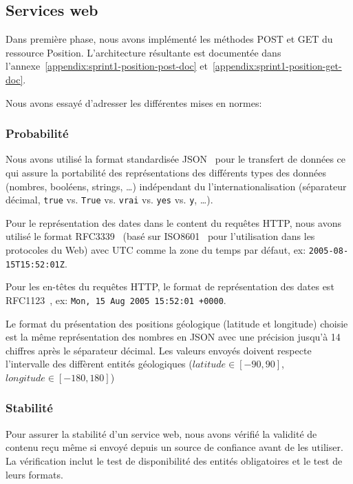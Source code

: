 \subsection{Services web}

Dans première phase, nous avons implémenté les méthodes POST et GET du
ressource Position. L'architecture résultante est documentée dans
l'annexe~\ref{appendix:sprint1-position-post-doc}
et~\ref{appendix:sprint1-position-get-doc}.

Nous avons essayé d'adresser les différentes mises en normes:

\subsubsection{Probabilité}

Nous avons utilisé la format standardisée JSON~\cite{ECMA-404} pour le
transfert de données ce qui assure la portabilité des représentations des
différents types des données (nombres, booléens, strings, \ldots) indépendant
du l'internationalisation (séparateur décimal, \verb|true| vs. \verb|True| vs.
\verb|vrai| vs. \verb|yes| vs. \verb|y|, \ldots).

Pour le représentation des dates dans le content du requêtes HTTP, nous avons
utilisé le format RFC3339~\cite{RFC3339} (basé sur ISO8601~\cite{ISO8601} pour
l'utilisation dans les protocoles du Web) avec UTC comme la zone du temps par
défaut, ex: \verb|2005-08-15T15:52:01Z|.

Pour les en-têtes du requêtes HTTP, le format de représentation des dates est
RFC1123~\cite{RFC1123}, ex: \verb|Mon, 15 Aug 2005 15:52:01 +0000|.

Le format du présentation des positions géologique (latitude et longitude)
choisie est la même représentation des nombres en JSON avec une précision
jusqu'à 14 chiffres après le séparateur décimal. Les valeurs envoyés doivent
respecte l'intervalle des diffèrent entités géologiques ($latitude \in [-90,
90]$, $longitude \in [-180, 180]$)

\subsubsection{Stabilité}

Pour assurer la stabilité d'un service web, nous avons vérifié la validité de
contenu reçu même si envoyé depuis un source de confiance avant de les
utiliser. La vérification inclut le test de disponibilité des entités
obligatoires et le test de leurs formats.

